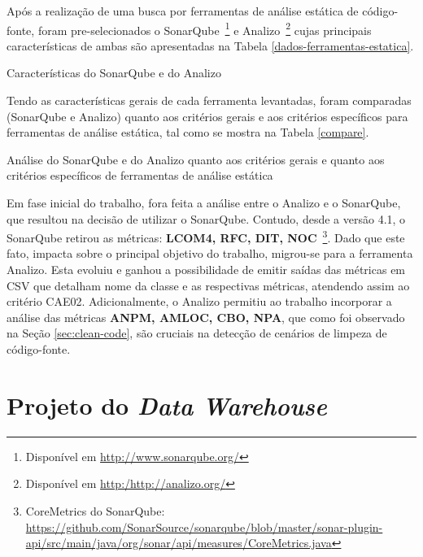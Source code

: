 Após a realização de uma busca por ferramentas de análise estática de código-fonte, foram pre-selecionados o SonarQube~\footnote{Disponível em \url{http://www.sonarqube.org/}} e Analizo~\footnote{Disponível em \url{http:/http://analizo.org/}} cujas principais características de ambas são apresentadas na Tabela \ref{dados-ferramentas-estatica}.

\begin{savenotes}
\begin{table}[!ht]
\centering

\caption{Características do SonarQube e do Analizo}
\label{dados-ferramentas-estatica}
\end{table}
\FloatBarrier
\end{savenotes}

Tendo as características gerais de cada ferramenta levantadas, foram comparadas (SonarQube e Analizo) quanto aos critérios gerais e aos critérios específicos para ferramentas de análise estática, tal como se mostra na Tabela \ref{compare}.


\begin{table}[!ht]
\centering

\caption{Análise do SonarQube e do Analizo quanto aos critérios gerais e quanto aos critérios específicos de ferramentas de análise estática}
\label{compare}
\end{table}
\FloatBarrier

Em fase inicial do trabalho, fora feita a análise entre o Analizo e o SonarQube, que resultou na decisão de utilizar o SonarQube. Contudo, desde a versão 4.1, o SonarQube retirou as métricas: \textbf{LCOM4, RFC, DIT, NOC}~\footnote{CoreMetrics do SonarQube: \url{https://github.com/SonarSource/sonarqube/blob/master/sonar-plugin-api/src/main/java/org/sonar/api/measures/CoreMetrics.java}}. Dado que este fato, impacta sobre o principal objetivo do trabalho, migrou-se para a ferramenta Analizo. Esta evoluiu e ganhou a possibilidade de emitir saídas das métricas em CSV que detalham nome da classe e as respectivas métricas, atendendo assim ao critério CAE02. Adicionalmente, o Analizo permitiu ao trabalho incorporar a análise das métricas \textbf{ANPM, AMLOC, CBO, NPA}, que como foi observado na Seção \ref{sec:clean-code}, são cruciais na detecção de cenários de limpeza de código-fonte.

\section{Projeto do \textit{Data Warehouse}}

